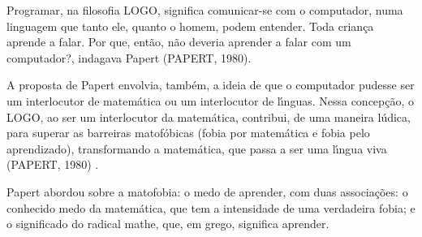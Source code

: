 \documentclass[
12pt,		%
openright,	%
twoside,  %
a4paper,			%
chapter=TITLE,		%
english,			%
french,				%
spanish,			%
brazil				%
]{USPSC-classe/USPSC}
\begin{document}
Programar, na filosofia LOGO, significa \textquotedbl comunicar-se com o computador, numa linguagem que tanto ele, quanto o homem,  podem entender\textquotedbl . Toda crian\c{c}a aprende a falar. Por que, ent\~ao, n\~ao deveria aprender a \textquotedbl falar com um computador?\textquotedbl , indagava Papert  (PAPERT, 1980).

















A proposta de Papert envolvia, tamb\'em, a ideia de que o computador pudesse ser um interlocutor  de matem\'atica ou um interlocutor de l\'{\i}nguas. Nessa concep\c{c}\~ao, o LOGO, ao ser um interlocutor da matem\'atica, contribui, de uma maneira l\'udica, para superar as barreiras matof\'obicas (fobia por matem\'atica e fobia pelo aprendizado), transformando a matem\'atica, que passa a ser uma l\'{\i}ngua viva (PAPERT, 1980) .

















Papert abordou sobre a \textquotedbl matofobia: o medo de aprender\textquotedbl , com duas associa\c{c}\~oes: o conhecido medo da matem\'atica, que tem a intensidade de uma verdadeira fobia; e o  significado do radical mathe, que, em grego, significa aprender.


















\noindent\begin{center}\mbox{\centering{}}\end{center}
\end{document}
